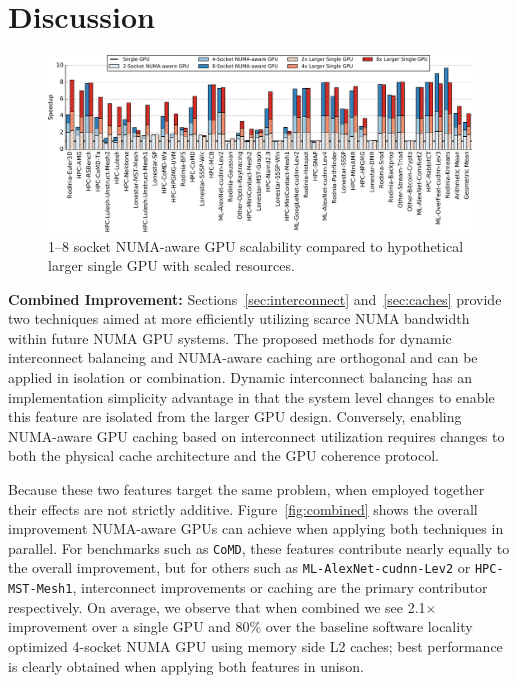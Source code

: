 \section {Discussion}
\label{sec:discussion}

\begin{figure}[t]
	\centering
	\includegraphics[width=1.0\textwidth]{figures/plot_scalability_mgpu_WB.pdf}
	\caption{1--8 socket NUMA-aware GPU scalability compared to hypothetical larger single GPU with scaled resources.}
	\label{fig:scalability}
\end{figure}

\textbf{Combined Improvement:} Sections~\ref{sec:interconnect} 
and~\ref{sec:caches} provide two techniques aimed at more efficiently utilizing 
scarce NUMA bandwidth within future NUMA GPU systems. The proposed methods
for dynamic interconnect balancing and NUMA-aware caching are orthogonal and 
can be applied in isolation or combination.  Dynamic interconnect balancing 
has an implementation simplicity advantage in that the system level changes to enable 
this feature are isolated from the larger GPU design.  Conversely, enabling 
NUMA-aware GPU caching based on interconnect utilization requires changes to both 
the physical cache architecture and the GPU coherence protocol.

Because these two features target the same problem, when employed 
together their effects are not strictly additive. Figure~\ref{fig:combined} 
shows the overall improvement NUMA-aware GPUs can achieve when applying 
both techniques in parallel.  For benchmarks such as \texttt{CoMD}, these 
features contribute nearly equally to the overall improvement, but for others 
such as \texttt{ML-AlexNet-cudnn-Lev2} or \texttt{HPC-MST-Mesh1}, 
interconnect improvements or caching are the primary contributor 
respectively.  On average, we observe that when combined we see 2.1$\times$ 
improvement over a single GPU and 80\% 
over the baseline software locality optimized 4-socket NUMA GPU 
using memory side L2 caches;  best performance is clearly obtained when
applying both features in unison.

